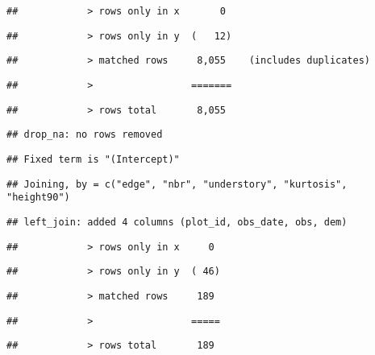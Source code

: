 \documentclass[
]{article}
\begin{document}
\begin{verbatim}
##            > rows only in x       0
\end{verbatim}

\begin{verbatim}
##            > rows only in y  (   12)
\end{verbatim}

\begin{verbatim}
##            > matched rows     8,055    (includes duplicates)
\end{verbatim}

\begin{verbatim}
##            >                 =======
\end{verbatim}

\begin{verbatim}
##            > rows total       8,055
\end{verbatim}

\begin{verbatim}
## drop_na: no rows removed
\end{verbatim}

\begin{verbatim}
## Fixed term is "(Intercept)"
\end{verbatim}

\begin{verbatim}
## Joining, by = c("edge", "nbr", "understory", "kurtosis", "height90")
\end{verbatim}

\begin{verbatim}
## left_join: added 4 columns (plot_id, obs_date, obs, dem)
\end{verbatim}

\begin{verbatim}
##            > rows only in x     0
\end{verbatim}

\begin{verbatim}
##            > rows only in y  ( 46)
\end{verbatim}

\begin{verbatim}
##            > matched rows     189
\end{verbatim}

\begin{verbatim}
##            >                 =====
\end{verbatim}

\begin{verbatim}
##            > rows total       189
\end{verbatim}
\end{document}
